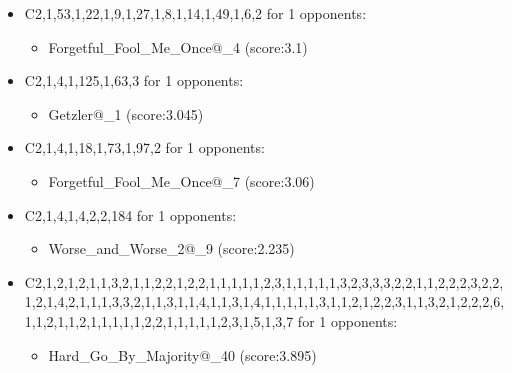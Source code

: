 \begin{appendices}
\begin{itemize}
        \item C2,1,53,1,22,1,9,1,27,1,8,1,14,1,49,1,6,2 for 1 opponents:
        \begin{multicols}{3}
            \begin{itemize}
                \item Forgetful\_Fool\_Me\_Once@\_4 (score:3.1)
            \end{itemize}
        \end{multicols}

        \item C2,1,4,1,125,1,63,3 for 1 opponents:
        \begin{multicols}{3}
            \begin{itemize}
                \item Getzler@\_1 (score:3.045)
            \end{itemize}
        \end{multicols}

        \item C2,1,4,1,18,1,73,1,97,2 for 1 opponents:
        \begin{multicols}{3}
            \begin{itemize}
                \item Forgetful\_Fool\_Me\_Once@\_7 (score:3.06)
            \end{itemize}
        \end{multicols}

        \item C2,1,4,1,4,2,2,184 for 1 opponents:
        \begin{multicols}{3}
            \begin{itemize}
                \item Worse\_and\_Worse\_2@\_9 (score:2.235)
            \end{itemize}
        \end{multicols}

        \item C2,1,2,1,2,1,1,3,2,1,1,2,2,1,2,2,1,1,1,1,1,2,3,1,1,1,1,1,3,2,3,3,3,2,2,1,1,2,2,2,3,2,2,1,2,1,4,2,1,1,1,3,3,2,1,1,3,1,1,4,1,1,3,1,4,1,1,1,1,1,3,1,1,2,1,2,2,3,1,1,3,2,1,2,2,2,6,1,1,2,1,1,2,1,1,1,1,1,2,2,1,1,1,1,1,2,3,1,5,1,3,7 for 1 opponents:
        \begin{multicols}{3}
            \begin{itemize}
                \item Hard\_Go\_By\_Majority@\_40 (score:3.895)
            \end{itemize}
        \end{multicols}


\end{itemize}
\end{appendices}
